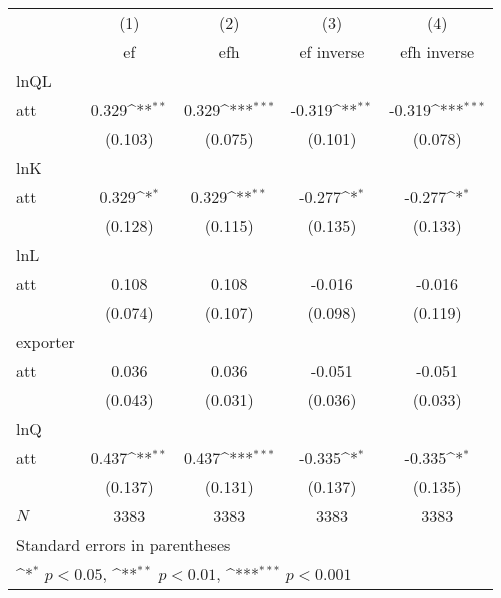 {
\def\sym#1{\ifmmode^{#1}\else\(^{#1}\)\fi}
\begin{tabular}{l*{4}{c}}
\hline\hline
            &\multicolumn{1}{c}{(1)}&\multicolumn{1}{c}{(2)}&\multicolumn{1}{c}{(3)}&\multicolumn{1}{c}{(4)}\\
            &\multicolumn{1}{c}{ef}&\multicolumn{1}{c}{efh}&\multicolumn{1}{c}{ef inverse}&\multicolumn{1}{c}{efh inverse}\\
\hline
lnQL        &                     &                     &                     &                     \\
att         &       0.329\sym{**} &       0.329\sym{***}&      -0.319\sym{**} &      -0.319\sym{***}\\
            &     (0.103)         &     (0.075)         &     (0.101)         &     (0.078)         \\
\hline
lnK         &                     &                     &                     &                     \\
att         &       0.329\sym{*}  &       0.329\sym{**} &      -0.277\sym{*}  &      -0.277\sym{*}  \\
            &     (0.128)         &     (0.115)         &     (0.135)         &     (0.133)         \\
\hline
lnL         &                     &                     &                     &                     \\
att         &       0.108         &       0.108         &      -0.016         &      -0.016         \\
            &     (0.074)         &     (0.107)         &     (0.098)         &     (0.119)         \\
\hline
exporter    &                     &                     &                     &                     \\
att         &       0.036         &       0.036         &      -0.051         &      -0.051         \\
            &     (0.043)         &     (0.031)         &     (0.036)         &     (0.033)         \\
\hline
lnQ         &                     &                     &                     &                     \\
att         &       0.437\sym{**} &       0.437\sym{***}&      -0.335\sym{*}  &      -0.335\sym{*}  \\
            &     (0.137)         &     (0.131)         &     (0.137)         &     (0.135)         \\
\hline
\(N\)       &        3383         &        3383         &        3383         &        3383         \\
\hline\hline
\multicolumn{5}{l}{\footnotesize Standard errors in parentheses}\\
\multicolumn{5}{l}{\footnotesize \sym{*} \(p<0.05\), \sym{**} \(p<0.01\), \sym{***} \(p<0.001\)}\\
\end{tabular}
}
